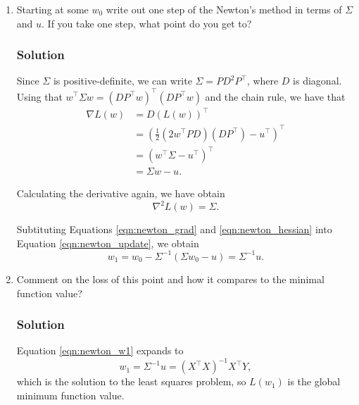 \documentclass[letterpaper,11pt]{article}
\begin{document}
\begin{enumerate}
\item Starting at some $w_0$ write out one step of the Newton's method in terms
  of $\Sigma$ and $u$. If you take one step, what point do you get to?

  \subsubsection*{Solution}

  Since $\Sigma$ is positive-definite, we can write $\Sigma = PD^2P^\intercal$,
  where $D$ is diagonal. Using that
  $w^\intercal \Sigma w = \left(D P^\intercal
    w\right)^\intercal\left(DP^\intercal w\right)$ and the chain rule, we have
  that
  \begin{align}
    \nabla L(w)
    &= D\left(L(w)\right)^\intercal \nonumber\\
    &= \left(\frac{1}{2} \left(2w^\intercal PD\right)\left(D P^\intercal\right)  - u^\intercal\right)^\intercal \nonumber\\
    &= \left(w^\intercal \Sigma - u^\intercal\right)^\intercal \nonumber\\
    &= \Sigma w - u.
      \label{eqn:newton_grad}
  \end{align}

  Calculating the derivative again, we have obtain
  \begin{equation}
    \nabla^2 L\left( w \right) = \Sigma.
    \label{eqn:newton_hessian}
  \end{equation}

  Subtituting Equations \ref{eqn:newton_grad} and \ref{eqn:newton_hessian} into
  Equation \ref{eqn:newton_update}, we obtain
  \begin{equation}
    w_1 = w_0 - \Sigma^{-1}\left(
      \Sigma w_0 - u
    \right) = \boxed{\Sigma^{-1} u.}
    \label{eqn:newton_w1}
  \end{equation}
  
\item Comment on the loss of this point and how it compares to the minimal
  function value?
  
  \subsubsection*{Solution}

  Equation \ref{eqn:newton_w1} expands to
  \begin{equation}
    w_1 = \Sigma^{-1} u = \left(X^\intercal X\right)^{-1}X^\intercal Y,
  \end{equation}
  which is the solution to the least squares problem, so $L(w_1)$ is the global
  minimum function value.
\end{enumerate}
\end{document}
